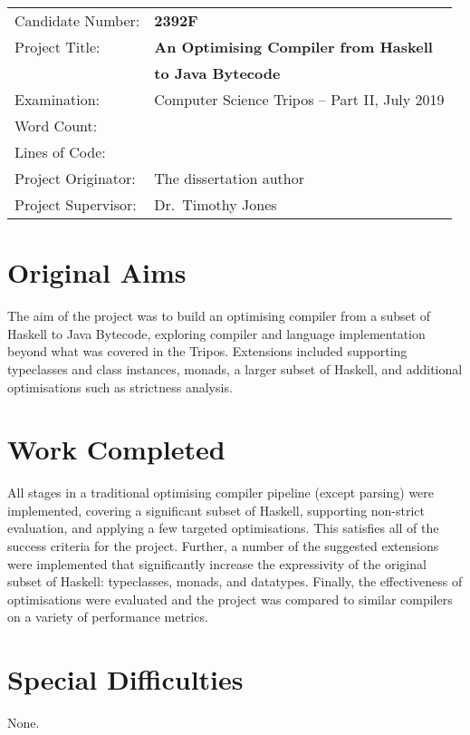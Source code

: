 \documentclass[dissertation.tex]{subfiles}
\begin{document}
{\large
\begin{tabular}{ll}
Candidate Number:   & \textbf{2392F} \\
Project Title:      & \textbf{An Optimising Compiler from Haskell} \\
                    & \textbf{to Java Bytecode} \\
Examination:        & Computer Science Tripos -- Part II, July 2019 \\
Word Count:         & \footnotemark[1] \\
Lines of Code:      & \footnotemark[2] \\
Project Originator: & The dissertation author \\
Project Supervisor: & Dr.\ Timothy Jones \\ 
\end{tabular}
}

\section*{Original Aims}
{
    The aim of the project was to build an optimising compiler from a subset of Haskell to Java Bytecode, exploring compiler and language implementation beyond what was covered in the Tripos. Extensions included supporting typeclasses and class instances, monads, a larger subset of Haskell, and additional optimisations such as strictness analysis.
}
\section*{Work Completed}
{
    All stages in a traditional optimising compiler pipeline (except parsing) were implemented, covering a significant subset of Haskell, supporting non-strict evaluation, and applying a few targeted optimisations. This satisfies all of the success criteria for the project. Further, a number of the suggested extensions were implemented that significantly increase the expressivity of the original subset of Haskell: typeclasses, monads, and datatypes. Finally, the effectiveness of optimisations were evaluated and the project was compared to similar compilers on a variety of performance metrics.
}
\section*{Special Difficulties}
{
    None.
}

\end{document}
